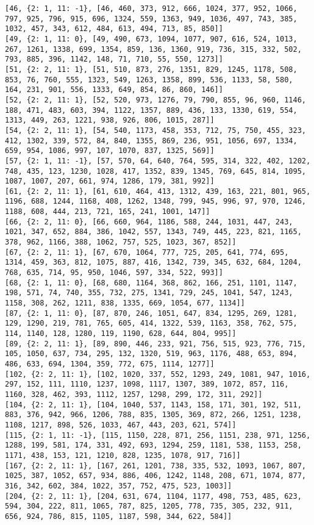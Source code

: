 \documentclass{article}
\begin{document}
\begin{verbatim}
[46, {2: 1, 11: -1}, [46, 460, 373, 912, 666, 1024, 377, 952, 1066, 797, 925, 796, 915, 696, 1324, 559, 1363, 949, 1036, 497, 743, 385, 1032, 457, 343, 612, 484, 613, 494, 713, 85, 850]]
[49, {2: 1, 11: 0}, [49, 490, 673, 1094, 1077, 907, 616, 524, 1013, 267, 1261, 1338, 699, 1354, 859, 136, 1360, 919, 736, 315, 332, 502, 793, 885, 396, 1142, 148, 71, 710, 55, 550, 1273]]
[51, {2: 2, 11: 1}, [51, 510, 873, 276, 1351, 829, 1245, 1178, 508, 853, 76, 760, 555, 1323, 549, 1263, 1358, 899, 536, 1133, 58, 580, 164, 231, 901, 556, 1333, 649, 854, 86, 860, 146]]
[52, {2: 2, 11: 1}, [52, 520, 973, 1276, 79, 790, 855, 96, 960, 1146, 188, 471, 483, 603, 394, 1122, 1357, 889, 436, 133, 1330, 619, 554, 1313, 449, 263, 1221, 938, 926, 806, 1015, 287]]
[54, {2: 2, 11: 1}, [54, 540, 1173, 458, 353, 712, 75, 750, 455, 323, 412, 1302, 339, 572, 84, 840, 1355, 869, 236, 951, 1056, 697, 1334, 659, 954, 1086, 997, 107, 1070, 837, 1325, 569]]
[57, {2: 1, 11: -1}, [57, 570, 64, 640, 764, 595, 314, 322, 402, 1202, 748, 435, 123, 1230, 1028, 417, 1352, 839, 1345, 769, 645, 814, 1095, 1087, 1007, 207, 661, 974, 1286, 179, 381, 992]]
[61, {2: 2, 11: 1}, [61, 610, 464, 413, 1312, 439, 163, 221, 801, 965, 1196, 688, 1244, 1168, 408, 1262, 1348, 799, 945, 996, 97, 970, 1246, 1188, 608, 444, 213, 721, 165, 241, 1001, 147]]
[66, {2: 2, 11: 0}, [66, 660, 964, 1186, 588, 244, 1031, 447, 243, 1021, 347, 652, 884, 386, 1042, 557, 1343, 749, 445, 223, 821, 1165, 378, 962, 1166, 388, 1062, 757, 525, 1023, 367, 852]]
[67, {2: 2, 11: 1}, [67, 670, 1064, 777, 725, 205, 641, 774, 695, 1314, 459, 363, 812, 1075, 887, 416, 1342, 739, 345, 632, 684, 1204, 768, 635, 714, 95, 950, 1046, 597, 334, 522, 993]]
[68, {2: 1, 11: 0}, [68, 680, 1164, 368, 862, 166, 251, 1101, 1147, 198, 571, 74, 740, 355, 732, 275, 1341, 729, 245, 1041, 547, 1243, 1158, 308, 262, 1211, 838, 1335, 669, 1054, 677, 1134]]
[87, {2: 1, 11: 0}, [87, 870, 246, 1051, 647, 834, 1295, 269, 1281, 129, 1290, 219, 781, 765, 605, 414, 1322, 539, 1163, 358, 762, 575, 114, 1140, 128, 1280, 119, 1190, 628, 644, 804, 995]]
[89, {2: 2, 11: 1}, [89, 890, 446, 233, 921, 756, 515, 923, 776, 715, 105, 1050, 637, 734, 295, 132, 1320, 519, 963, 1176, 488, 653, 894, 486, 633, 694, 1304, 359, 772, 675, 1114, 1277]]
[102, {2: 2, 11: 1}, [102, 1020, 337, 552, 1293, 249, 1081, 947, 1016, 297, 152, 111, 1110, 1237, 1098, 1117, 1307, 389, 1072, 857, 116, 1160, 328, 462, 393, 1112, 1257, 1298, 299, 172, 311, 292]]
[104, {2: 2, 11: 1}, [104, 1040, 537, 1143, 158, 171, 301, 192, 511, 883, 376, 942, 966, 1206, 788, 835, 1305, 369, 872, 266, 1251, 1238, 1108, 1217, 898, 526, 1033, 467, 443, 203, 621, 574]]
[115, {2: 1, 11: -1}, [115, 1150, 228, 871, 256, 1151, 238, 971, 1256, 1288, 199, 581, 174, 331, 492, 693, 1294, 259, 1181, 538, 1153, 258, 1171, 438, 153, 121, 1210, 828, 1235, 1078, 917, 716]]
[167, {2: 2, 11: 1}, [167, 261, 1201, 738, 335, 532, 1093, 1067, 807, 1025, 387, 1052, 657, 934, 886, 406, 1242, 1148, 208, 671, 1074, 877, 316, 342, 602, 384, 1022, 357, 752, 475, 523, 1003]]
[204, {2: 2, 11: 1}, [204, 631, 674, 1104, 1177, 498, 753, 485, 623, 594, 304, 222, 811, 1065, 787, 825, 1205, 778, 735, 305, 232, 911, 656, 924, 786, 815, 1105, 1187, 598, 344, 622, 584]]

\end{verbatim}
\end{document}
